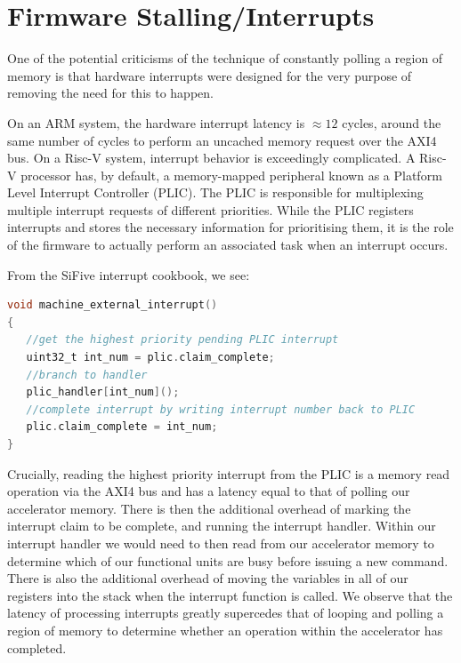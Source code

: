 \documentclass[a4paper,8pt]{report}
\begin{document}
\section{Firmware Stalling/Interrupts}
One of the potential criticisms of the technique of constantly polling a region
of memory is that hardware interrupts were designed for the very purpose of
removing the need for this to happen.

On an ARM system, the hardware interrupt latency is $\approx 12$
cycles\cite{arm-irl}, around the same number of cycles to perform an uncached
memory request over the AXI4 bus. On a Risc-V system, interrupt behavior is
exceedingly complicated. A Risc-V processor
has, by default, a memory-mapped peripheral known as a Platform Level Interrupt
Controller (PLIC). The PLIC is responsible for multiplexing multiple interrupt
requests of different priorities. While the PLIC registers interrupts and stores
the necessary information for prioritising them, it is the role of the firmware
to actually perform an associated task when an interrupt occurs.

From the SiFive interrupt cookbook\cite{sifive-ir}, we see:
\begin{lstlisting}[language=C,style=customc]
void machine_external_interrupt()
{
   //get the highest priority pending PLIC interrupt
   uint32_t int_num = plic.claim_complete;
   //branch to handler
   plic_handler[int_num]();
   //complete interrupt by writing interrupt number back to PLIC
   plic.claim_complete = int_num;
}
\end{lstlisting}

Crucially, reading the highest priority interrupt from the PLIC is a memory
read operation via the AXI4 bus and has a latency equal to that of polling our
accelerator memory. There is then the additional overhead of marking the
interrupt claim to be complete, and running the interrupt handler. Within our
interrupt handler we would need to then read from our accelerator memory to
determine which of our functional units are busy before issuing a new command.
There is also the additional overhead of moving the variables in all of our
registers into the stack when the interrupt function is called. We observe that
the latency of processing interrupts greatly supercedes that of looping and
polling a region of memory to determine whether an operation within the
accelerator has completed.
\end{document}
